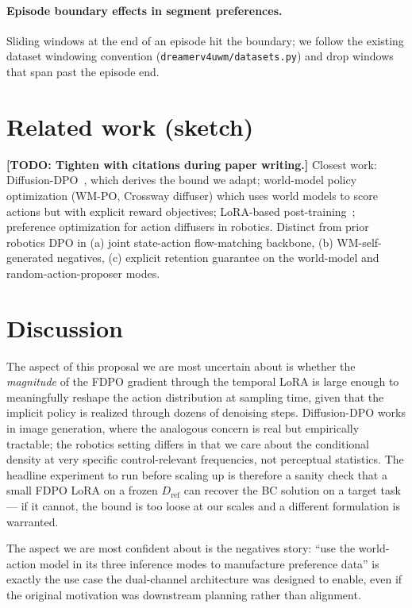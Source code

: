 \documentclass[11pt]{article}
\newcommand{\todo}[1]{\textbf{[TODO: #1]}}
\newcommand{\Dref}{D_{\mathrm{ref}}}
\begin{document}
\paragraph{Episode boundary effects in segment preferences.} Sliding windows at the end of an episode hit the boundary; we follow the existing dataset windowing convention (\texttt{dreamerv4uwm/datasets.py}) and drop windows that span past the episode end.

\section{Related work (sketch)}
\label{sec:related}

\todo{Tighten with citations during paper writing.} Closest work: Diffusion-DPO~\cite{wallace2024diffusion}, which derives the bound we adapt; world-model policy optimization (WM-PO, Crossway diffuser) which uses world models to score actions but with explicit reward objectives; LoRA-based post-training~\cite{hu2022lora}; preference optimization for action diffusers in robotics. Distinct from prior robotics DPO in (a) joint state-action flow-matching backbone, (b) WM-self-generated negatives, (c) explicit retention guarantee on the world-model and random-action-proposer modes.

\section{Discussion}
\label{sec:discussion}

The aspect of this proposal we are most uncertain about is whether the \emph{magnitude} of the FDPO gradient through the temporal LoRA is large enough to meaningfully reshape the action distribution at sampling time, given that the implicit policy is realized through dozens of denoising steps. Diffusion-DPO works in image generation, where the analogous concern is real but empirically tractable; the robotics setting differs in that we care about the conditional density at very specific control-relevant frequencies, not perceptual statistics. The headline experiment to run before scaling up is therefore a sanity check that a small FDPO LoRA on a frozen $\Dref$ can recover the BC solution on a target task --- if it cannot, the bound is too loose at our scales and a different formulation is warranted.

The aspect we are most confident about is the negatives story: ``use the world-action model in its three inference modes to manufacture preference data'' is exactly the use case the dual-channel architecture was designed to enable, even if the original motivation was downstream planning rather than alignment.
\end{document}
